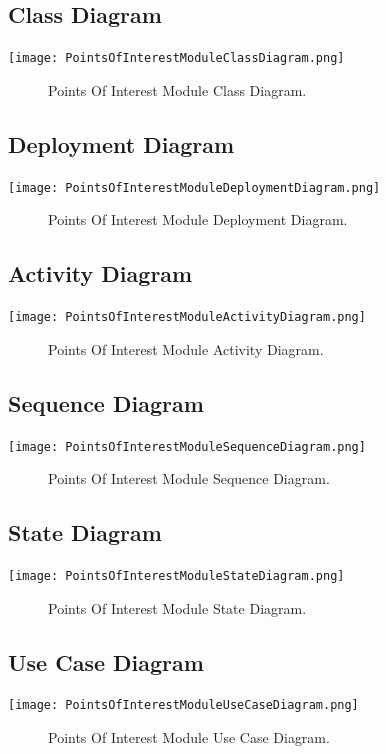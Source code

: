 \documentclass[12pt]{article}
\begin{document}
	\subsection{Class Diagram}
        \texttt{[image: PointsOfInterestModuleClassDiagram.png]}
        \begin{figure}[h]
            \caption{Points Of Interest Module Class Diagram.}
        \end{figure}
    
    \subsection{Deployment Diagram}
        \texttt{[image: PointsOfInterestModuleDeploymentDiagram.png]}
        \begin{figure}[h]
            \caption{Points Of Interest Module Deployment Diagram.}
        \end{figure}
        
    \subsection{Activity Diagram}
        \texttt{[image: PointsOfInterestModuleActivityDiagram.png]}
        \begin{figure}[h]
            \caption{Points Of Interest Module Activity Diagram.}
        \end{figure}

    \subsection{Sequence Diagram}
        \texttt{[image: PointsOfInterestModuleSequenceDiagram.png]}
        \begin{figure}[h]
            \caption{Points Of Interest Module Sequence Diagram.}
        \end{figure}

	
	\subsection{State Diagram}
       \texttt{[image: PointsOfInterestModuleStateDiagram.png]}
        \begin{figure}[h]
        	\caption{Points Of Interest Module State Diagram.}
        \end{figure}
	
	\subsection{Use Case Diagram}
        	\texttt{[image: PointsOfInterestModuleUseCaseDiagram.png]}
        	\begin{figure}[h]
        		\caption{Points Of Interest Module Use Case Diagram.}
        	\end{figure}
        	
\end{document}
